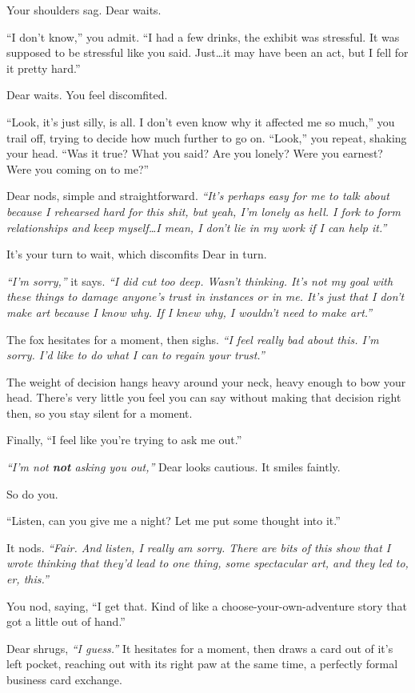 Your shoulders sag. Dear waits.

``I don't know,'' you admit. ``I had a few drinks, the exhibit was stressful. It was supposed to be stressful like you said. Just\ldots{}it may have been an act, but I fell for it pretty hard.''

Dear waits. You feel discomfited.

``Look, it's just silly, is all. I don't even know why it affected me so much,'' you trail off, trying to decide how much further to go on. ``Look,'' you repeat, shaking your head. ``Was it true? What you said? Are you lonely? Were you earnest? Were you coming on to me?''

Dear nods, simple and straightforward. \emph{``It's perhaps easy for me to talk about because I rehearsed hard for this shit, but yeah, I'm lonely as hell. I fork to form relationships and keep myself\ldots{}I mean, I don't lie in my work if I can help it.''}

It's your turn to wait, which discomfits Dear in turn.

\emph{``I'm sorry,''} it says. \emph{``I did cut too deep. Wasn't thinking. It's not my goal with these things to damage anyone's trust in instances or in me. It's just that I don't make art because I know why. If I knew why, I wouldn't need to make art.''}

The fox hesitates for a moment, then sighs. \emph{``I feel really bad about this. I'm sorry. I'd like to do what I can to regain your trust.''}

The weight of decision hangs heavy around your neck, heavy enough to bow your head. There's very little you feel you can say without making that decision right then, so you stay silent for a moment.

Finally, ``I feel like you're trying to ask me out.''

\emph{``I'm not \textbf{not} asking you out,''} Dear looks cautious. It smiles faintly.

So do you.

``Listen, can you give me a night? Let me put some thought into it.''

It nods. \emph{``Fair. And listen, I really am sorry. There are bits of this show that I wrote thinking that they'd lead to one thing, some spectacular art, and they led to, er, this.''}

You nod, saying, ``I get that. Kind of like a choose-your-own-adventure story that got a little out of hand.''

Dear shrugs, \emph{``I guess.''} It hesitates for a moment, then draws a card out of it's left pocket, reaching out with its right paw at the same time, a perfectly formal business card exchange.

